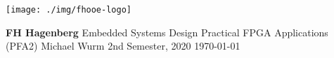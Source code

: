\thispagestyle{empty} %
\hfill
\texttt{[image: ./img/fhooe-logo]}

\begin{center}
	\textbf{\Large }
	\linebreak
	\linebreak
	\linebreak
	\linebreak
	\linebreak
	\horizontalLine{0.5 mm}
	\linebreak
	\linebreak
	\textbf{\huge \UebungNr}
	\linebreak
	\linebreak
	\linebreak
	\LARGE \UebungTopic
	\linebreak
	\linebreak
	\horizontalLine{0.5 mm}
	\linebreak
	\linebreak
	\linebreak
	\linebreak
	\linebreak
	\linebreak
	\Large {\textbf{FH Hagenberg}}
	\linebreak
	\linebreak
	\Large { Embedded Systems Design }
	\linebreak
	\linebreak
	\Large { Practical FPGA Applications (PFA2) }
	\linebreak
	\linebreak
	\linebreak
	\linebreak
	\linebreak
	\Large {Michael Wurm}
	\linebreak
	\linebreak
	\linebreak
	\linebreak
	\linebreak
	\normalsize{ 2nd Semester, 2020 }
	\linebreak
	\linebreak
	\large{\today}

\end{center}

